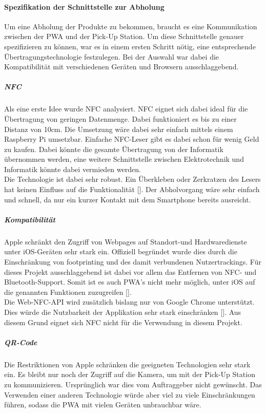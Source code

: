 \paragraph{Spezifikation der Schnittstelle zur Abholung}\label{SpezifikationSchnittstelleAbholung}
Um eine Abholung der Produkte zu bekommen, braucht es eine Kommunikation zwischen der \ac{PWA} und der Pick-Up Station. Um diese Schnittstelle genauer spezifizieren zu können, war es in einem ersten Schritt nötig, eine entsprechende Übertragungstechnologie festzulegen. Bei der Auswahl war dabei die Kompatibilität mit verschiedenen Geräten und Browsern ausschlaggebend. 
\subparagraph{NFC}
Als eine erste Idee wurde \ac{NFC} analysiert. \ac{NFC} eignet sich dabei ideal für die Übertragung von geringen Datenmenge. Dabei funktioniert es bis zu einer Distanz von 10cm. Die Umsetzung wäre dabei sehr einfach mittels einem Raspberry Pi umsetzbar. Einfache \ac{NFC}-Leser gibt es dabei schon für wenig Geld zu kaufen. Dabei könnte die gesamte Übertragung von der Informatik übernommen werden, eine weitere Schnittstelle zwischen Elektrotechnik und Informatik könnte dabei vermieden werden.  \\Die Technologie ist dabei sehr robust. Ein Überkleben oder Zerkratzen des Lesers hat keinen Einfluss auf die Funktionalität  [\cite{nfc}]. 
Der Abholvorgang wäre sehr einfach und schnell, da nur ein kurzer Kontakt mit dem Smartphone bereits ausreicht. 
\subparagraph{Kompatibilität}  
Apple schränkt den Zugriff von Webpages auf Standort-und Hardwaredienste unter iOS-Geräten sehr stark ein. Offiziell begründet wurde dies durch die Einschränkung von footprinting und des damit verbundenen Nutzertrackings. Für dieses Projekt ausschlaggebend ist dabei vor allem das Entfernen von NFC- und Bluetooth-Support. Somit ist es auch \ac{PWA}'s nicht mehr möglich, unter iOS auf die genannten Funktionen zuzugreifen [\cite{webKitTracking}].\\
Die Web-NFC-API wird zusätzlich bislang nur von Google Chrome unterstützt. Dies würde die Nutzbarkeit der Applikation sehr stark einschränken [\cite{kompWebNFC}]. 
Aus diesem Grund eignet sich \ac{NFC} nicht für die Verwendung in diesem Projekt. 
\subparagraph{QR-Code}\label{qrcode}
Die Restriktionen von Apple schränken die geeigneten Technologien sehr stark ein. Es bleibt nur noch der Zugriff auf die Kamera, um mit der Pick-Up Station zu kommunizieren. Ursprünglich war dies vom Auftraggeber nicht gewünscht. Das Verwenden einer anderen Technologie würde aber viel zu viele Einschränkungen führen, sodass die \ac{PWA} mit vielen Geräten unbrauchbar wäre. \\
